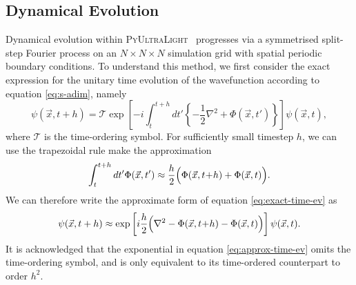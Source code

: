 \documentclass[a4paper,11pt]{article}
\newcommand{\PyUltraLight}{\textsc{PyUltraLight }}
\begin{document}
\subsection{Dynamical Evolution}\label{sec:dynamics}

Dynamical evolution within \PyUltraLight\ progresses via a symmetrised split-step Fourier process on an $N\times N\times N$ simulation grid with spatial periodic boundary conditions. To understand this method, we first consider the exact expression for the unitary time evolution of the wavefunction according to equation \ref{eq:s-adim}, namely
\begin{equation}\label{eq:exact-time-ev}
    \psi(\vec{x},t+h)=\mathcal{T}\operatorname{exp}\left[-i\int_t^{t+h}dt'\left\{-\frac{1}{2}\nabla^2+\Phi(\vec{x},t')\right\}\right]\psi(\vec{x},t),
\end{equation}
where $\mathcal{T}$ is the time-ordering symbol. For sufficiently small timestep $h$, we can use the trapezoidal rule make the approximation
\begin{equation}
    \int_t^{t+h}dt'\Phi(\vec{x},t')\approx \frac{h}{2}\Big(\Phi(\vec{x},t\hspace*{-.2em}+\hspace*{-.2em}h)+\Phi(\vec{x},t)\Big).
\end{equation}
We can therefore write the approximate form of equation \ref{eq:exact-time-ev} as
\begin{equation}\label{eq:approx-time-ev}
    \psi(\vec{x},t+h)\approx \operatorname{exp}\left[i\frac{h}{2}\Big(\nabla^2-\Phi(\vec{x},t\hspace*{-.2em}+\hspace*{-.2em}h)-\Phi(\vec{x},t)\Big)\right]\psi(\vec{x},t).
\end{equation}
It is acknowledged that the exponential in equation \ref{eq:approx-time-ev} omits the time-ordering symbol, and is only equivalent to its time-ordered counterpart to order $h^2$.
\end{document}
